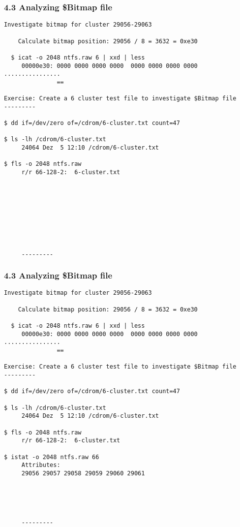\begin{frame}[fragile]
  \frametitle{4.3 Analyzing \$Bitmap file}
  \begin{lstlisting}[basicstyle=\tiny]
Investigate bitmap for cluster 29056-29063

    Calculate bitmap position: 29056 / 8 = 3632 = 0xe30
  
  $ icat -o 2048 ntfs.raw 6 | xxd | less
     00000e30: 0000 0000 0000 0000  0000 0000 0000 0000  ................
               ==

Exercise: Create a 6 cluster test file to investigate $Bitmap file
---------

$ dd if=/dev/zero of=/cdrom/6-cluster.txt count=47

$ ls -lh /cdrom/6-cluster.txt 
     24064 Dez  5 12:10 /cdrom/6-cluster.txt

$ fls -o 2048 ntfs.raw
     r/r 66-128-2:	6-cluster.txt









     ---------
  \end{lstlisting}
\end{frame}


\begin{frame}[fragile]
  \frametitle{4.3 Analyzing \$Bitmap file}
  \begin{lstlisting}[basicstyle=\tiny]
Investigate bitmap for cluster 29056-29063

    Calculate bitmap position: 29056 / 8 = 3632 = 0xe30
  
  $ icat -o 2048 ntfs.raw 6 | xxd | less
     00000e30: 0000 0000 0000 0000  0000 0000 0000 0000  ................
               ==

Exercise: Create a 6 cluster test file to investigate $Bitmap file
---------

$ dd if=/dev/zero of=/cdrom/6-cluster.txt count=47

$ ls -lh /cdrom/6-cluster.txt 
     24064 Dez  5 12:10 /cdrom/6-cluster.txt

$ fls -o 2048 ntfs.raw
     r/r 66-128-2:	6-cluster.txt

$ istat -o 2048 ntfs.raw 66
     Attributes: 
     29056 29057 29058 29059 29060 29061

     



     ---------
  \end{lstlisting}
\end{frame}


